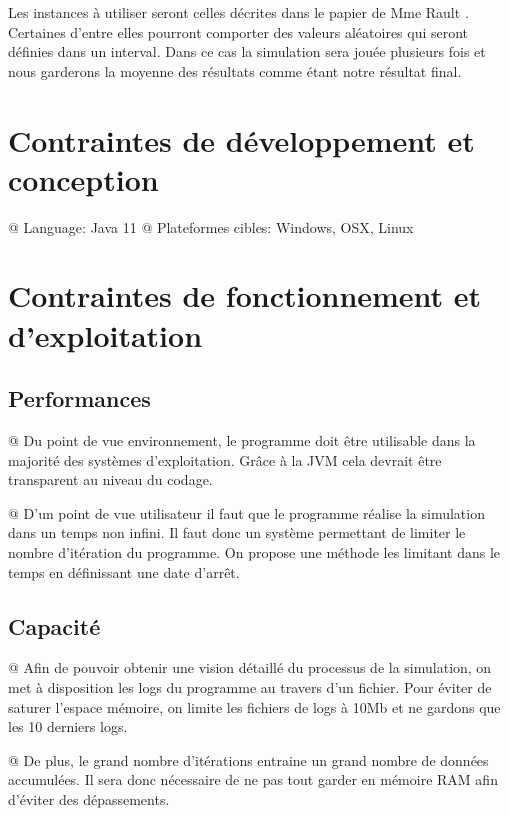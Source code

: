 \documentclass[final]{polytech/polytech}
\begin{document}
		Les instances à utiliser seront celles décrites dans le papier de Mme Rault \cite{Rault:chargers}.
		Certaines d'entre elles pourront comporter des valeurs aléatoires qui seront définies dans un interval.
		Dans ce cas la simulation sera jouée plusieurs fois et nous garderons la moyenne des résultats comme étant notre résultat final.

	\section{Contraintes de développement et conception}
		\begin{easylist}[itemize]
			@ Language: Java 11
			@ Plateformes cibles: Windows, OSX, Linux
		\end{easylist}
		
	\section{Contraintes de fonctionnement et d'exploitation}
		\subsection{Performances}
			\begin{easylist}
				@ Du point de vue environnement, le programme doit être utilisable dans la majorité des systèmes d'exploitation.
				Grâce à la JVM cela devrait être transparent au niveau du codage.
			
				@ D'un point de vue utilisateur il faut que le programme réalise la simulation dans un temps non infini.
				Il faut donc un système permettant de limiter le nombre d'itération du programme.
				On propose une méthode les limitant dans le temps en définissant une date d'arrêt.
			\end{easylist}
			
		\subsection{Capacité}
			\begin{easylist}
				@ Afin de pouvoir obtenir une vision détaillé du processus de la simulation, on met à disposition les logs du programme au travers d'un fichier.
				Pour éviter de saturer l'espace mémoire, on limite les fichiers de logs à 10Mb et ne gardons que les 10 derniers logs.
			
				@ De plus, le grand nombre d'itérations entraine un grand nombre de données accumulées.
				Il sera donc nécessaire de ne pas tout garder en mémoire RAM afin d'éviter des dépassements.
			\end{easylist}
\end{document}
